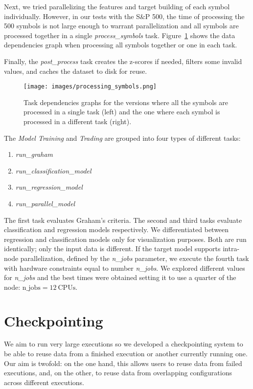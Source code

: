 Next, we tried parallelizing the features and target building of each symbol individually. However, in our tests with the S\&P 500, the time of processing the 500 symbols is not large enough to warrant parallelization and all symbols are processed together in a single \textit{process\_symbols} task. Figure~\ref{fig:process_symbols} shows the data dependencies graph when processing all symbols together or one in each task.

Finally, the \textit{post\_process} task creates the z-scores if needed, filters some invalid values, and caches the dataset to disk for reuse. 

\begin{figure}
    \centering
    \texttt{[image: images/processing\_symbols.png]}
    \caption{\small Task dependencies graphs for the versions where all the symbols are processed in a single task (left) and the one where each symbol is processed in a different task (right).}
    \label{fig:process_symbols}
\end{figure}

The \textit{Model Training} and \textit{Trading} are grouped into four types of different tasks:
\begin{enumerate}
    \item \textit{run\_graham} 
    \item \textit{run\_classification\_model}
    \item \textit{run\_regression\_model}
    \item \textit{run\_parallel\_model}
\end{enumerate}

The first task evaluates Graham's criteria. The second and third tasks evaluate classification  and regression models respectively. We differentiated between regression and classification models only for visualization purposes. Both are run identically; only the input data is different.
If the target model supports intra-node parallelization, defined by the \textit{n\_jobs} parameter, we execute the fourth task with hardware constraints equal to number \textit{n\_jobs}. We explored different values for \textit{n\_jobs} and the best times were obtained setting it to use a quarter of the node: $\text{n\_jobs} = 12~\text{CPUs}$.

\section{Checkpointing}


We aim to run very large executions so we developed a checkpointing system to be able to reuse data from a finished execution or another currently running one. Our aim is twofold: on the one hand, this allows users to reuse data from failed executions, and, on the other, to reuse data from overlapping configurations across different executions.

